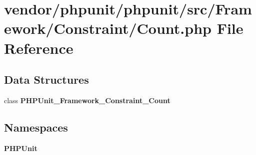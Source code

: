 \section{vendor/phpunit/phpunit/src/\+Framework/\+Constraint/\+Count.php File Reference}
\label{_count_8php}
\subsection*{Data Structures}
\begin{DoxyCompactItemize}
\item 
class {\bf P\+H\+P\+Unit\+\_\+\+Framework\+\_\+\+Constraint\+\_\+\+Count}
\end{DoxyCompactItemize}
\subsection*{Namespaces}
\begin{DoxyCompactItemize}
\item 
 {\bf P\+H\+P\+Unit}
\end{DoxyCompactItemize}
